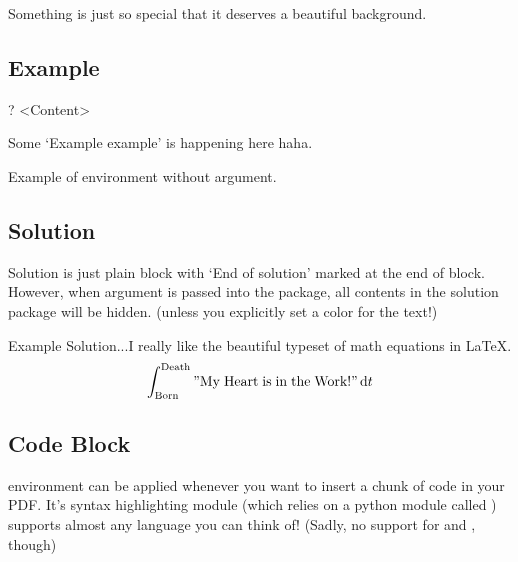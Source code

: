 \documentclass{article}
\begin{document}
    \begin{note}
        Something is just so special that it deserves a beautiful background.
    \end{note}

    \subsection{Example}

\begin{codeblock}[tex]
\begin{example}?
    <Content>
\end{example}
\end{codeblock}

\begin{example}
    Some `Example example' is happening here haha.
\end{example}

\begin{example}
    Example of  environment without argument.
\end{example}

    \subsection{Solution}

    Solution is just plain block with `End of solution' marked at the end of block. However, when  argument is passed into the  package, all contents in the solution package will be hidden. (unless you explicitly set a color for the text!)

    \begin{solution}
        Example Solution...I really like the beautiful typeset of math equations in LaTeX.
        \begin{equation*}
            \int_{\mathrm{Born}}^{\mathrm{Death}}{\mathrm{"My\;Heart\;is\;in\;the\;Work!"} \dd{t}}
        \end{equation*}
    \end{solution}

    \subsection{Code Block}

     environment can be applied whenever you want to insert a chunk of code in your PDF. It's syntax highlighting module (which relies on a python module called ) supports almost any language you can think of! (Sadly, no support for  and , though)
\end{document}
